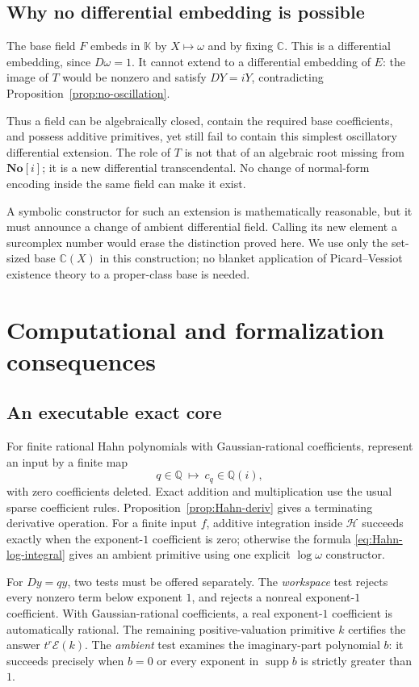 \documentclass[11pt,a4paper]{article}
\numberwithin{equation}{section}
\theoremstyle{definition}
\theoremstyle{remark}
\newcommand{\No}{\mathbf{No}}
\newcommand{\K}{\mathbb K}
\newcommand{\C}{\mathbb C}
\newcommand{\Q}{\mathbb Q}
\newcommand{\HH}{\mathscr H}
\newcommand{\EE}{\mathcal E}
\newcommand{\supp}{\operatorname{supp}}
\begin{document}
\subsection{Why no differential embedding is possible}

The base field $F$ embeds in $\K$ by $X\mapsto\omega$ and by fixing
$\C$. This is a differential embedding, since $D\omega=1$. It cannot
extend to a differential embedding of $E$: the image of $T$ would be
nonzero and satisfy $DY=iY$, contradicting
Proposition~\ref{prop:no-oscillation}.

Thus a field can be algebraically closed, contain the required base
coefficients, and possess additive primitives, yet still fail to contain
this simplest oscillatory differential extension. The role of $T$ is not
that of an algebraic root missing from $\No[i]$; it is a new differential
transcendental. No change of normal-form encoding inside the same field
can make it exist.

A symbolic constructor for such an extension is mathematically reasonable,
but it must announce a change of ambient differential field. Calling its
new element a surcomplex number would erase the distinction proved here.
We use only the set-sized base $\C(X)$ in this construction; no blanket
application of Picard--Vessiot existence theory to a proper-class base is
needed.

\section{Computational and formalization consequences}
\label{sec:implementation}

\subsection{An executable exact core}

For finite rational Hahn polynomials with Gaussian-rational coefficients,
represent an input by a finite map
\[
 q\in\Q\ \longmapsto\ c_q\in\Q(i),
\]
with zero coefficients deleted. Exact addition and multiplication use the
usual sparse coefficient rules. Proposition~\ref{prop:Hahn-deriv} gives a
terminating derivative operation. For a finite input $f$, additive
integration inside $\HH$ succeeds exactly when the exponent-$1$
coefficient is zero; otherwise the formula
\eqref{eq:Hahn-log-integral} gives an ambient primitive using one explicit
$\log\omega$ constructor.

For $Dy=qy$, two tests must be offered separately. The \emph{workspace}
test rejects every nonzero term below exponent $1$, and rejects a
nonreal exponent-$1$ coefficient. With Gaussian-rational coefficients, a
real exponent-$1$ coefficient is automatically rational. The remaining
positive-valuation primitive $k$ certifies the answer
$t^r\EE(k)$. The \emph{ambient} test examines the imaginary-part polynomial
$b$: it succeeds precisely when $b=0$ or every exponent in $\supp b$ is
strictly greater than $1$.
\end{document}
